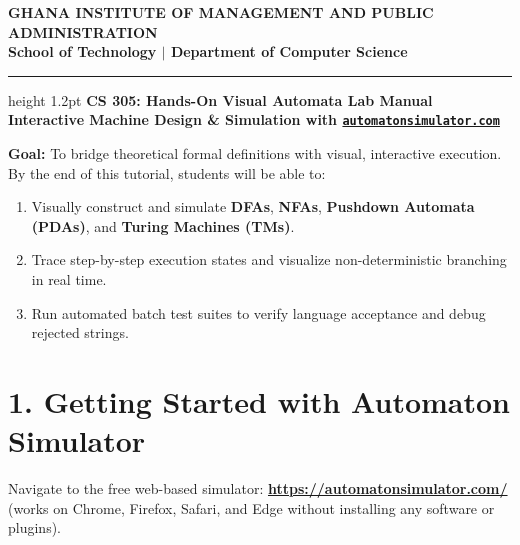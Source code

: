 \documentclass[11pt,a4paper]{article}
\begin{document}
\begin{center}
    {\Large \textbf{\color{gimpanavy}GHANA INSTITUTE OF MANAGEMENT AND PUBLIC ADMINISTRATION}}\\
    {\large \textbf{\color{gimpaaccent}School of Technology $|$ Department of Computer Science}}\\
    \vspace{4pt}
    \hrule height 1.2pt \color{gimpanavy}
    \vspace{6pt}
    {\LARGE \textbf{\color{gimpanavy}CS 305: Hands-On Visual Automata Lab Manual}}\\
    {\large \textbf{Interactive Machine Design \& Simulation with \href{https://automatonsimulator.com/}{\texttt{automatonsimulator.com}}}}
\end{center}

\vspace{6pt}

\begin{tcolorbox}[colback=gimpalight, colframe=gimpanavy, title=\textbf{Laboratory Overview \& Objectives}]
\textbf{Goal:} To bridge theoretical formal definitions with visual, interactive execution. By the end of this tutorial, students will be able to:
\begin{enumerate}[leftmargin=1.5em, itemsep=2pt]
    \item Visually construct and simulate \textbf{DFAs}, \textbf{NFAs}, \textbf{Pushdown Automata (PDAs)}, and \textbf{Turing Machines (TMs)}.
    \item Trace step-by-step execution states and visualize non-deterministic branching in real time.
    \item Run automated batch test suites to verify language acceptance and debug rejected strings.
\end{enumerate}
\end{tcolorbox}

\vspace{8pt}

\section*{1. Getting Started with Automaton Simulator}
Navigate to the free web-based simulator: \textbf{\url{https://automatonsimulator.com/}} (works on Chrome, Firefox, Safari, and Edge without installing any software or plugins).
\end{document}
